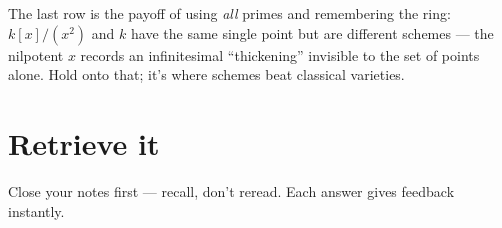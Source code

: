 The last row is the payoff of using \emph{all} primes and remembering the ring:
$k[x]/(x^2)$ and $k$ have the same single point but are different schemes --- the
nilpotent $x$ records an infinitesimal ``thickening'' invisible to the set of
points alone. Hold onto that; it's where schemes beat classical varieties.

\begin{center}
\end{center}

\section*{Retrieve it}

Close your notes first --- recall, don't reread. Each answer gives feedback
instantly.

